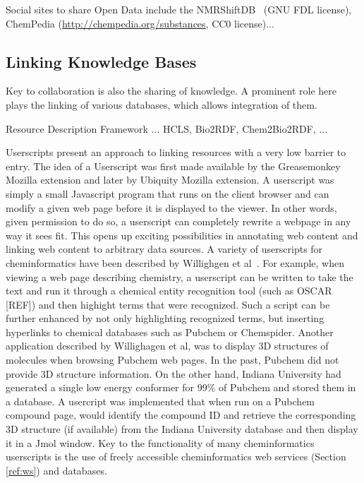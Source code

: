 \documentclass[12pt]{book}
\begin{document}

Social sites to share Open Data include the
NMRShiftDB~\cite{Steinbeck2004} (GNU FDL license),
ChemPedia (\url{http://chempedia.org/substances}, CC0 license)...


\subsection{Linking Knowledge Bases}

Key to collaboration is also the sharing of knowledge. A prominent role here
plays the linking of various databases, which allows integration of them.

Resource Description Framework ... HCLS, Bio2RDF, Chem2Bio2RDF, ...

Userscripts present an approach to linking resources with a very low
barrier to entry. The idea of a Userscript was first made available by
the Greasemonkey Mozilla extension and later by Ubiquity Mozilla
extension. A userscript was simply a small Javascript program that
runs on the client browser and can modify a given web page before it
is displayed to the viewer. In other words, given permission to do so,
a userscript can completely rewrite a webpage in any way it sees
fit. This opens up exciting possibilities in annotating web content
and linking web content to arbitrary data sources. A variety of
userscripts for cheminformatics have been described by Willighgen et
al~\cite{XXX}. For example, when viewing a web page describing
chemistry, a userscript can be written to take the text and run it
through a chemical entity recognition tool (such as OSCAR [REF]) and
then highight terms that were recognized. Such a script can be further
enhanced by not only highlighting recognized terms, but inserting
hyperlinks to chemical databases such as Pubchem or
Chemspider. Another application described by Willighagen et al, was to
display 3D structures of molecules when browsing Pubchem web pages. In
the past, Pubchem did not provide 3D structure information. On the
other hand, Indiana University had generated a single low energy
conformer for 99\% of Pubchem and stored them in a database. A
usercript was implemented that when run on a Pubchem compound page,
would identify the compound ID and retrieve the corresponding 3D
structure (if available) from the Indiana University database and then
display it in a Jmol window. Key to the functionality of many
cheminformatics userscripts is the use of freely accessible
cheminformatics web services (Section \ref{ref:ws}) and databases.
\end{document}
